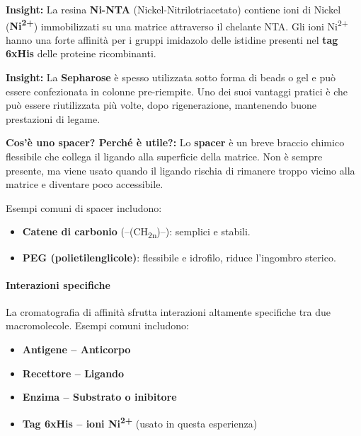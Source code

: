 \begin{insightBox}\footnotesize
	\textbf{Insight:} La resina \textbf{Ni-NTA} (Nickel-Nitrilotriacetato) contiene ioni di Nickel (\textbf{Ni\textsuperscript{2+}}) immobilizzati su una matrice attraverso il chelante NTA.  
	Gli ioni Ni\textsuperscript{2+} hanno una forte affinità per i gruppi imidazolo delle istidine presenti nel \textbf{tag 6xHis} delle proteine ricombinanti.
\end{insightBox}

\begin{insightBox}\footnotesize
	\textbf{Insight:} La \textbf{Sepharose} è spesso utilizzata sotto forma di beads o gel e può essere confezionata in colonne pre-riempite.  
	Uno dei suoi vantaggi pratici è che può essere riutilizzata più volte, dopo rigenerazione, mantenendo buone prestazioni di legame.
\end{insightBox}

\begin{percheBox}\footnotesize
	\textbf{Cos'è uno spacer? Perché è utile?:}  
	Lo \textbf{spacer} è un breve braccio chimico flessibile che collega il ligando alla superficie della matrice.  
	Non è sempre presente, ma viene usato quando il ligando rischia di rimanere troppo vicino alla matrice e diventare poco accessibile.
  
  \vspace{0.5em}
	Esempi comuni di spacer includono:
	\begin{itemize}
		\item \textbf{Catene di carbonio} (–(CH\textsubscript{2n})–): semplici e stabili.
		\item \textbf{PEG (polietilenglicole)}: flessibile e idrofilo, riduce l’ingombro sterico.
	\end{itemize}
\end{percheBox}





\paragraph{Interazioni specifiche}
La cromatografia di affinità sfrutta interazioni altamente specifiche tra due macromolecole. Esempi comuni includono:
\begin{itemize}\footnotesize
  \item \textbf{Antigene – Anticorpo}
  \item \textbf{Recettore – Ligando}
  \item \textbf{Enzima – Substrato o inibitore}
  \item \textbf{Tag 6xHis – ioni Ni\textsuperscript{2+}} (usato in questa esperienza)
\end{itemize}

